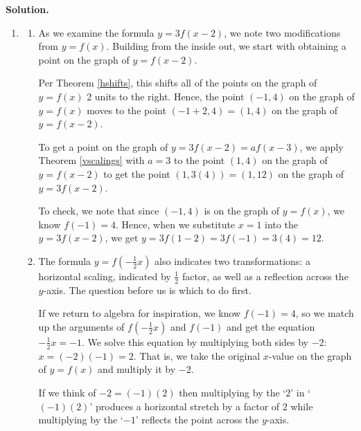\begin{ex}
 {\bf Solution.}
 
 \begin{enumerate}
 
 \item  
 
 \begin{enumerate}
 
 \item  As we examine the formula  $y = 3f(x-2)$, we note two modifications from $y=f(x)$.  Building from the inside out, we start with obtaining a point on the graph of $y=f(x-2)$. 
 
 \smallskip
 
 Per Theorem \ref{hshifts}, this shifts all of the points on the graph of $y=f(x)$ $2$ units to the right.  Hence, the point $(-1,4)$ on the graph of $y=f(x)$ moves to the point $(-1+2, 4) = (1,4)$  on the graph of $y=f(x-2)$.  
 
 \smallskip
 
 To get a point on the graph of $y = 3f(x-2) = a f(x-3)$, we apply Theorem \ref{vscalings} with $a=3$ to the point $(1,4)$ on the graph of $y=f(x-2)$ to  get the point $(1,3(4)) = (1,12)$ on the graph of $y=3f(x-2)$.  
 
 \smallskip
 
 To check, we note that since $(-1,4)$ is on the graph of $y=f(x)$, we know $f(-1)=4$.  Hence, when we substitute $x=1$ into the $y=3f(x-2)$, we get $y=3f(1-2) = 3f(-1) = 3(4) = 12$.
 
 \item The formula $y = f\left(-\frac{1}{2} x \right)$ also indicates two transformations:  a horizontal scaling, indicated by $\frac{1}{2}$ factor, as well as a reflection across the $y$-axis.  The question before us is which to do first. 
 
 \smallskip
 
  If we return to algebra for inspiration, we know $f(-1) = 4$, so we match up the arguments of $f\left(-\frac{1}{2} x \right)$ and $f(-1)$ and get the equation $-\frac{1}{2} x  = -1$. We solve this equation by multiplying both sides by $-2$:  $x = (-2)(-1) = 2$.  That is, we take the original $x$-value on the graph of $y=f(x)$ and multiply it by $-2$.  
  
  \smallskip
  
  If we think of $-2= (-1)(2)$ then multiplying by the `$2$' in `$(-1)(2)$' produces a horizontal stretch by a factor of $2$ while multiplying by the `$-1$'  reflects the point across the $y$-axis. 
  

\end{enumerate}
\end{enumerate}
\end{ex}
